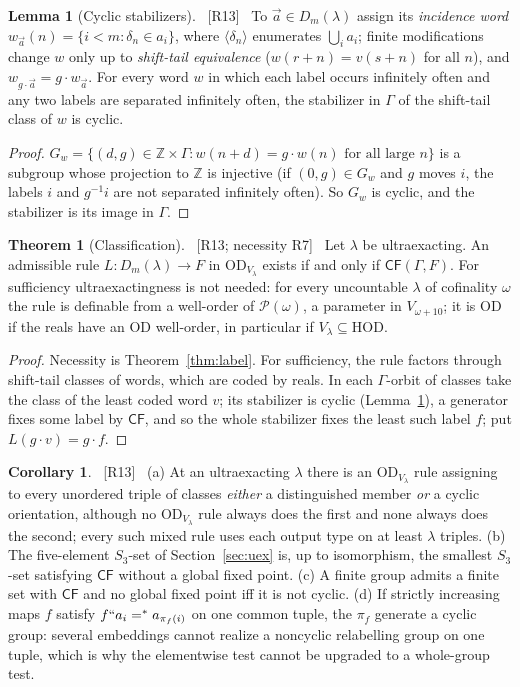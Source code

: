 \documentclass[11pt,letterpaper]{article}
\theoremstyle{definition}
\newtheorem{theorem}[definition]{Theorem}
\newtheorem{lemma}[definition]{Lemma}
\newtheorem{corollary}[definition]{Corollary}
\numberwithin{equation}{section}
\newcommand{\HOD}{\mathrm{HOD}}
\newcommand{\OD}{\mathrm{OD}}
\newcommand{\Pow}{\mathcal P}
\newcommand{\CF}{\mathsf{CF}}
\newcommand{\src}[1]{\unskip\ {\normalfont\small\sffamily\color{Olive}[#1]}\ }
\begin{document}
\begin{lemma}[Cyclic stabilizers]\label{lem:cyclic}\src{R13}
To $\vec a\in D_m(\lambda)$ assign its \emph{incidence word} $w_{\vec a}(n)=\{i<m:\delta_n\in a_i\}$, where $\langle\delta_n\rangle$ enumerates $\bigcup_ia_i$; finite modifications change $w$ only up to \emph{shift-tail equivalence} ($w(r+n)=v(s+n)$ for all $n$), and $w_{g\cdot\vec a}=g\cdot w_{\vec a}$. For every word $w$ in which each label occurs infinitely often and any two labels are separated infinitely often, the stabilizer in $\Gamma$ of the shift-tail class of $w$ is cyclic.
\end{lemma}

\begin{proof}
$G_w=\{(d,g)\in\mathbb Z\times\Gamma:w(n+d)=g\cdot w(n)\text{ for all large }n\}$ is a subgroup whose projection to $\mathbb Z$ is injective (if $(0,g)\in G_w$ and $g$ moves $i$, the labels $i$ and $g^{-1}i$ are not separated infinitely often). So $G_w$ is cyclic, and the stabilizer is its image in $\Gamma$.
\end{proof}

\begin{theorem}[Classification]\label{thm:classification}\src{R13; necessity R7}
Let $\lambda$ be ultraexacting. An admissible rule $L:D_m(\lambda)\to F$ in $\OD_{V_\lambda}$ exists if and only if $\CF(\Gamma,F)$. For sufficiency ultraexactingness is not needed: for every uncountable $\lambda$ of cofinality $\omega$ the rule is definable from a well-order of $\Pow(\omega)$, a parameter in $V_{\omega+10}$; it is $\OD$ if the reals have an $\OD$ well-order, in particular if $V_\lambda\subseteq\HOD$.
\end{theorem}

\begin{proof}
Necessity is Theorem~\ref{thm:label}. For sufficiency, the rule factors through shift-tail classes of words, which are coded by reals. In each $\Gamma$-orbit of classes take the class of the least coded word $v$; its stabilizer is cyclic (Lemma~\ref{lem:cyclic}), a generator fixes some label by $\CF$, and so the whole stabilizer fixes the least such label $f$; put $L(g\cdot v)=g\cdot f$.
\end{proof}

\begin{corollary}\label{cor:five}\src{R13}
(a) At an ultraexacting $\lambda$ there is an $\OD_{V_\lambda}$ rule assigning to every unordered triple of classes \emph{either} a distinguished member \emph{or} a cyclic orientation, although no $\OD_{V_\lambda}$ rule always does the first and none always does the second; every such mixed rule uses each output type on at least $\lambda$ triples. (b) The five-element $S_3$-set of Section~\ref{sec:uex} is, up to isomorphism, the smallest $S_3$-set satisfying $\CF$ without a global fixed point. (c) A finite group admits a finite set with $\CF$ and no global fixed point iff it is not cyclic. (d) If strictly increasing maps $f$ satisfy $f``a_i=^*a_{\pi_f(i)}$ on one common tuple, the $\pi_f$ generate a cyclic group: several embeddings cannot realize a noncyclic relabelling group on one tuple, which is why the elementwise test cannot be upgraded to a whole-group test.
\end{corollary}
\end{document}
